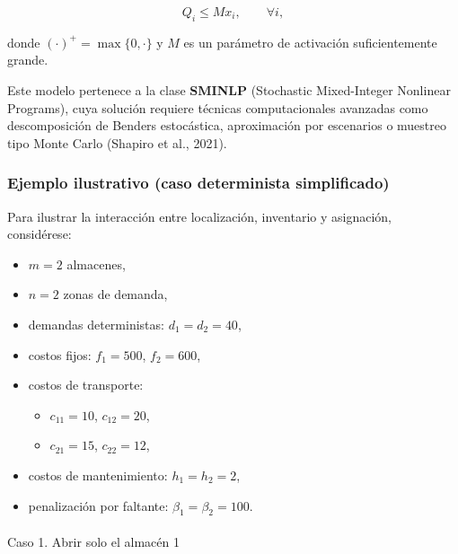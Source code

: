 \documentclass[
  spanish,
  letterpaper,
  DIV=11,
  numbers=noendperiod]{scrartcl}
\makeatletter
\let\oldparagraph\paragraph
\renewcommand{\paragraph}{
    \@ifstar
      \xxxParagraphStar
      \xxxParagraphNoStar
  }
\newcommand{\xxxParagraphStar}[1]{\oldparagraph*{#1}\mbox{}}
\newcommand{\xxxParagraphNoStar}[1]{\oldparagraph{#1}\mbox{}}
\providecommand{\tightlist}{%
  \setlength{\itemsep}{0pt}\setlength{\parskip}{0pt}}
\makeatother
\begin{document}
\[
Q_i \le M x_i, \qquad \forall i,
\]

donde \((\cdot)^+ = \max\{0,\cdot\}\) y \(M\) es un parámetro de
activación suficientemente grande.

Este modelo pertenece a la clase \textbf{SMINLP} (Stochastic
Mixed-Integer Nonlinear Programs), cuya solución requiere técnicas
computacionales avanzadas como descomposición de Benders estocástica,
aproximación por escenarios o muestreo tipo Monte Carlo (Shapiro et al.,
2021).

\subsubsection{Ejemplo ilustrativo (caso determinista
simplificado)}\label{ejemplo-ilustrativo-caso-determinista-simplificado}

Para ilustrar la interacción entre localización, inventario y
asignación, considérese:

\begin{itemize}
\tightlist
\item
  \(m = 2\) almacenes,\\
\item
  \(n = 2\) zonas de demanda,\\
\item
  demandas deterministas: \(d_1 = d_2 = 40\),\\
\item
  costos fijos: \(f_1 = 500\), \(f_2 = 600\),\\
\item
  costos de transporte:

  \begin{itemize}
  \tightlist
  \item
    \(c_{11} = 10\), \(c_{12} = 20\),\\
  \item
    \(c_{21} = 15\), \(c_{22} = 12\),\\
  \end{itemize}
\item
  costos de mantenimiento: \(h_1 = h_2 = 2\),\\
\item
  penalización por faltante: \(\beta_1 = \beta_2 = 100\).
\end{itemize}

\paragraph{Caso 1. Abrir solo el almacén
1}\label{caso-1.-abrir-solo-el-almacuxe9n-1}
\end{document}
